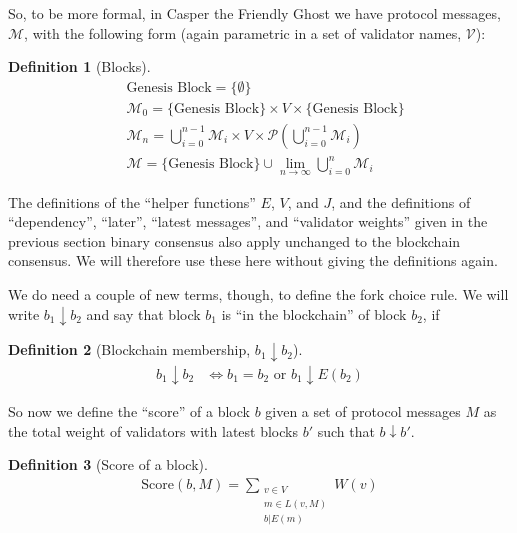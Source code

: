 \documentclass{article}
\theoremstyle{definition}
\newtheorem{defn}{Definition}[section]
\begin{document}
So, to be more formal, in Casper the Friendly Ghost we have protocol messages, $\mathcal{M}$, with the following form (again parametric in a set of validator names, $\mathcal{V}$): 


\begin{defn}[Blocks]
\begin{equation*}
\begin{split}
  &\text{Genesis Block} = \{\emptyset\}\\
    &\mathcal{M}_0 = \{\text{Genesis Block}\} \times V \times \{\text{Genesis Block}\}\\
    &\mathcal{M}_n = \bigcup_{i=0}^{n-1} \mathcal{M}_i \times V \times \mathcal{P}(\bigcup_{i=0}^{n-1} \mathcal{M}_i)\\
    &\mathcal{M} = \{\text{Genesis Block}\} \cup \lim_{n \to \infty} \bigcup_{i=0}^{n} \mathcal{M}_i
\end{split}
\end{equation*}
\end{defn}

The definitions of the ``helper functions'' $E$, $V$, and $J$, and the definitions of ``dependency'', ``later'', ``latest messages'', and ``validator weights'' given in the previous section binary consensus also apply unchanged to the blockchain consensus. We will therefore use these here without giving the definitions again. 

We do need a couple of new terms, though, to define the fork choice rule. We will write $b_1 \downarrow b_2$ and say that block $b_1$ is ``in the blockchain'' of block $b_2$, if 

\begin{defn}[Blockchain membership, $b_1 \downarrow b_2$]
\begin{align}
  b_1 \downarrow b_2 &\iff b_1 = b_2 \text{ or } b_1 \downarrow E(b_2) 
\end{align}
\end{defn}

So now we define the ``score'' of a block $b$ given a set of protocol messages $M$ as the total weight of validators with latest blocks $b'$ such that $b \downarrow b'$.

\begin{defn}[Score of a block]
\begin{align}
\text{Score}(b, M) = \sum_{\substack{v \in V \\ m \in L(v,M) \\ b|E(m)}} W(v)
\end{align}
\end{defn}
\end{document}
